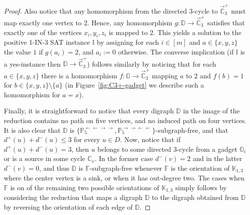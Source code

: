 \documentclass{article}
\theoremstyle{definition}
\theoremstyle{remark}
\newcommand{\bC}{{\mathbb C}}
\newcommand{\bD}{{\mathbb D}}
\newcommand{\bF}{{\mathbb F}}
\newcommand{\bG}{{\mathbb G}}
\newcommand{\bI}{{\mathbb I}}
\newcommand{\bK}{{\mathbb K}}
\newcommand{\bP}{{\mathbb P}}
\begin{document}
\begin{proof}
   Also notice that any homomorphism from the directed $3$-cycle to $\vec{\bC}_3^+$ must map exactly one vertex to $2$. 
   Hence, any homomorphism $g\colon\bD\to \vec{\bC}_3^+$ satisfies that exactly one of
   the vertices $x_i,y_i,z_i$ is mapped to $2$. This yields a solution to the positive
   1-IN-3 SAT instance $\bI$ by assigning for each $i\in[m]$ and $a\in\{x,y,z\}$
   the value $1$ if $g(a_i) = 2$, and $a_i := 0$ otherwise. The converse implication
   (if $\bI$ is a yes-instance then $\bD\to \vec{\bC}_3^+$) follows similarly by noticing
   that for each $a\in \{x,y,z\}$ there is a homomorphism $f\colon \bG\to \vec{\bC}_3^+$
   mapping $a$ to $2$ and $f(b) = 1$ for $b\in\{x,y,z\}\setminus\{a\}$ (in Figure~\ref{fig:C3+-gadget}
   we describe such a homomorphism for $a = x$).

   Finally, it is straightforward to notice that every digraph $\bD$ in the image of the reduction
   contains no path on five vertices, and no induced path on four vertices. It is also clear
   that $\bD$ is $\{\bP_5^{\leftarrow\leftarrow\to\to},\bP_5^{\to\to\leftarrow\leftarrow}\}$-subgraph-free,
   and  that $d^+(u) + d^-(u) \le 3$ for every $u\in D$. Now,  notice that if $d^+(u) + d^-(u) = 3$,
   then $u$ belongs to some directed $3$-cycle from a gadget $\bG_i$ or is a source in some cycle
   $\bC_v$. In the former case $d^-(v) = 2$ and in the latter $d^-(v) = 0$, and thus $\bD$ is
   $\bF$-subgraph-free whenever $\bF$ is the orientation of $\bK_{1,3}$ where the center
   vertex is a sink, or when it has out-degree two. The cases when $\bF$ is on of the remaining
   two possible orientations of $\bK_{1,3}$ simply follows by considering the reduction
   that maps a digraph $\bD$ to the digraph obtained from $\bD$ by reversing the orientation of each edge of $\bD$. 
\end{proof}
\end{document}
